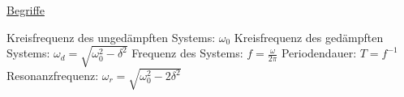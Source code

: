 \underline{Begriffe}
\begin{outline}
    \1 Kreisfrequenz des ungedämpften Systems: $\omega_0$
    \1 Kreisfrequenz des gedämpften Systems:
    $\omega_d=\sqrt{\omega_0^2-\delta^2}$
    \1 Frequenz des Systems:
    $f = \frac{\omega}{2\pi}$
    \1 Periodendauer:
    $T = f^{-1}$
    \1 Resonanzfrequenz:
    $\omega_r=\sqrt{\omega_0^2-2\delta^2}$
\end{outline}
